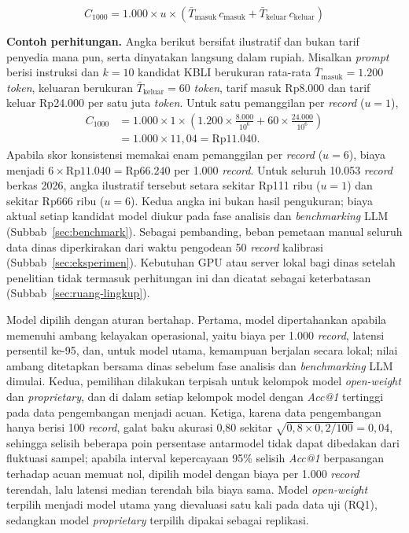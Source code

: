 \begin{equation}
  C_{1000} = 1.000 \times u \times \left( \bar{T}_{\text{masuk}}\, c_{\text{masuk}} + \bar{T}_{\text{keluar}}\, c_{\text{keluar}} \right)
  \label{eq:biaya}
\end{equation}

\noindent\textbf{Contoh perhitungan.} Angka berikut bersifat ilustratif dan bukan tarif penyedia mana pun, serta dinyatakan langsung dalam rupiah. Misalkan \textit{prompt} berisi instruksi dan $k = 10$ kandidat KBLI berukuran rata-rata $\bar{T}_{\text{masuk}} = 1.200$ \textit{token}, keluaran berukuran $\bar{T}_{\text{keluar}} = 60$ \textit{token}, tarif masuk Rp8.000 dan tarif keluar Rp24.000 per satu juta \textit{token}. Untuk satu pemanggilan per \textit{record} ($u = 1$),
\begin{align*}
  C_{1000} &= 1.000 \times 1 \times \left( 1.200 \times \frac{8.000}{10^{6}} + 60 \times \frac{24.000}{10^{6}} \right)\\
           &= 1.000 \times 11{,}04 = \text{Rp}11.040.
\end{align*}
Apabila skor konsistensi memakai enam pemanggilan per \textit{record} ($u = 6$), biaya menjadi $6 \times \text{Rp}11.040 = \text{Rp}66.240$ per 1.000 \textit{record}. Untuk seluruh 10.053 \textit{record} berkas 2026, angka ilustratif tersebut setara sekitar Rp111 ribu ($u = 1$) dan sekitar Rp666 ribu ($u = 6$). Kedua angka ini bukan hasil pengukuran; biaya aktual setiap kandidat model diukur pada fase analisis dan \textit{benchmarking} LLM (Subbab~\ref{sec:benchmark}). Sebagai pembanding, beban pemetaan manual seluruh data dinas diperkirakan dari waktu pengodean 50 \textit{record} kalibrasi (Subbab~\ref{sec:eksperimen}). Kebutuhan GPU atau server lokal bagi dinas setelah penelitian tidak termasuk perhitungan ini dan dicatat sebagai keterbatasan (Subbab~\ref{sec:ruang-lingkup}).

Model dipilih dengan aturan bertahap. Pertama, model dipertahankan apabila memenuhi ambang kelayakan operasional, yaitu biaya per 1.000 \textit{record}, latensi persentil ke-95, dan, untuk model utama, kemampuan berjalan secara lokal; nilai ambang ditetapkan bersama dinas sebelum fase analisis dan \textit{benchmarking} LLM dimulai. Kedua, pemilihan dilakukan terpisah untuk kelompok model \textit{open-weight} dan \textit{proprietary}, dan di dalam setiap kelompok model dengan \textit{Acc@1} tertinggi pada data pengembangan menjadi acuan. Ketiga, karena data pengembangan hanya berisi 100 \textit{record}, galat baku akurasi 0,80 sekitar $\sqrt{0{,}8 \times 0{,}2/100} = 0{,}04$, sehingga selisih beberapa poin persentase antarmodel tidak dapat dibedakan dari fluktuasi sampel; apabila interval kepercayaan 95\% selisih \textit{Acc@1} berpasangan terhadap acuan memuat nol, dipilih model dengan biaya per 1.000 \textit{record} terendah, lalu latensi median terendah bila biaya sama. Model \textit{open-weight} terpilih menjadi model utama yang dievaluasi satu kali pada data uji (RQ1), sedangkan model \textit{proprietary} terpilih dipakai sebagai replikasi.

